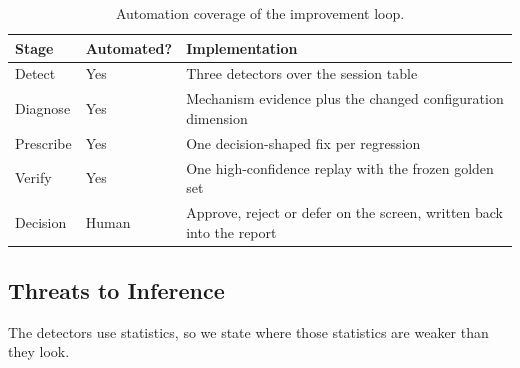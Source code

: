 \documentclass[8pt,twocolumn,a4paper]{extarticle}
\begin{document}
\begin{table}[H]
\centering
\caption{Automation coverage of the improvement loop.}
\label{tab:loop}
\small
\begin{tabularx}{\columnwidth}{@{}l l X@{}}
\toprule
\textbf{Stage} & \textbf{Automated?} & \textbf{Implementation} \\
\midrule
Detect & Yes & Three detectors over the session table \\
Diagnose & Yes & Mechanism evidence plus the changed configuration dimension \\
Prescribe & Yes & One decision-shaped fix per regression \\
Verify & Yes & One high-confidence replay with the frozen golden set \\
Decision & Human & Approve, reject or defer on the screen, written back into the report \\
\bottomrule
\end{tabularx}
\end{table}

\subsection{Threats to Inference}

The detectors use statistics, so we state where those statistics are
weaker than they look.
\end{document}
